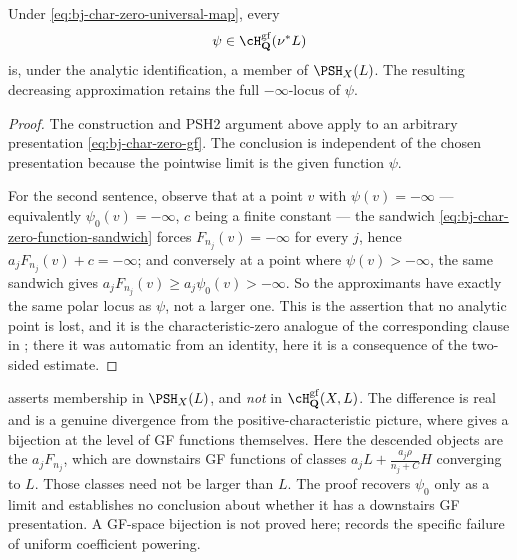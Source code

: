 \begin{proposition}\label{prop:bj-char-zero-stage-reflection}
Under \eqref{eq:bj-char-zero-universal-map}, every
\[
                 \psi\in\cH^{\mathrm{gf}}_{\mathbf Q}(\nu^*L)
\]
is, under the analytic identification, a member of $\PSH_X(L)$.
The resulting decreasing approximation retains the full
$-\infty$-locus of $\psi$.
\end{proposition}

\begin{proof}
The construction and PSH2 argument above apply to an arbitrary presentation
\eqref{eq:bj-char-zero-gf}.
The conclusion is independent of the chosen presentation because the
pointwise limit is the given function $\psi$.

For the second sentence, observe that at a point $v$ with
$\psi(v)=-\infty$ --- equivalently $\psi_0(v)=-\infty$, $c$ being a
finite constant --- the sandwich
\eqref{eq:bj-char-zero-function-sandwich} forces $F_{n_j}(v)=-\infty$ for
every $j$, hence $a_jF_{n_j}(v)+c=-\infty$; and conversely at a point
where $\psi(v)>-\infty$, the same sandwich gives
$a_jF_{n_j}(v)\ge a_j\psi_0(v)>-\infty$.  So the approximants have exactly
the same polar locus as $\psi$, not a larger one.  This is the assertion
that no analytic point is lost, and it is the characteristic-zero analogue
of the corresponding clause in
; there it was automatic from an
identity, here it is a consequence of the two-sided estimate.
\end{proof}

\begin{remark}
\label{rem:ch44-approximants-are-gf}
 asserts membership in
$\PSH_X(L)$, and \emph{not} in
$\cH^{\mathrm{gf}}_{\mathbf Q}(X,L)$.  The difference is real and is a
genuine divergence from the positive-characteristic picture, where
 gives a bijection at the level of GF functions
themselves.  Here the descended objects are the $a_jF_{n_j}$, which are
downstairs GF functions of classes $a_jL+\frac{a_j\rho}{n_j+C}H$
converging to $L$.  Those classes need not be larger than $L$.
The proof recovers $\psi_0$ only as a limit and establishes no
conclusion about whether it has a downstairs GF presentation.
A GF-space bijection is not proved here;
 records the specific failure of
uniform coefficient powering.
\end{remark}


